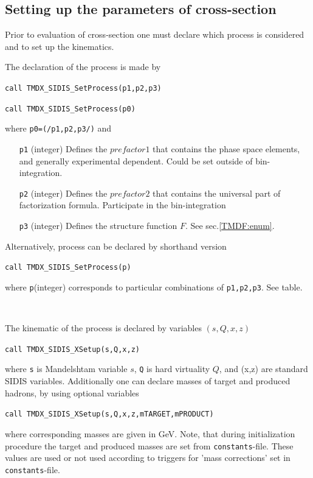 \documentclass[prd,nofootinbib,eqsecnum,final]{revtex4}
\renewcommand{\(}{\left(}
\renewcommand{\)}{\right)}
\renewcommand{\[}{\left[}
\renewcommand{\]}{\right]}
\begin{document}
\subsection{Setting up the parameters of cross-section}
\label{TMDXs:setup}

Prior to evaluation of cross-section one must declare which process is considered and to set up the kinematics. 

The declaration of the process is made by

\texttt{call TMDX\_SIDIS{\_}SetProcess(p1,p2,p3)}

\texttt{call TMDX\_SIDIS{\_}SetProcess(p0)}

where \texttt{p0=(/p1,p2,p3/)} and
\begin{itemize}
\item[\texttt{p1}] (integer) Defines the $prefactor1$ that contains the phase space elements, and generally experimental dependent. Could be set outside of bin-integration.
\item[\texttt{p2}] (integer) Defines the $prefactor2$ that contains the universal part of factorization formula. Participate in the bin-integration
\item[\texttt{p3}] (integer) Defines the structure function $F$. See sec.\ref{TMDF:enum}.
\end{itemize}

Alternatively, process can be declared by shorthand version

\texttt{call TMDX\_SIDIS{\_}SetProcess(p)}

where \texttt{p}(integer) corresponds to particular combinations of \texttt{p1,p2,p3}. See table.

~

The kinematic of the process is declared by variables $(s,Q,x,z)$

\texttt{call TMDX\_SIDIS{\_}XSetup(s,Q,x,z)}

where \texttt{s} is Mandelshtam variable $s$, \texttt{Q} is hard virtuality $Q$, and (x,z) are standard SIDIS variables. Additionally one can declare masses of target and produced hadrons, by using optional variables

\texttt{call TMDX\_SIDIS{\_}XSetup(s,Q,x,z,mTARGET,mPRODUCT)}

where corresponding masses are given in GeV. Note, that during initialization procedure the target and produced masses are set from \texttt{constants}-file. These values are used or not used according to triggers for 'mass corrections' set in \texttt{constants}-file.
\end{document}
